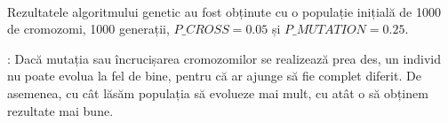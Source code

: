 \documentclass[paper=a4, fontsize=11pt]{scrartcl}
\begin{document}
\begin{table}[h]
    \end{table}


\begin{table}[h]
    \end{table}

\paragraph{}
Rezultatele algoritmului genetic au fost obținute cu o populație inițială de 1000 de cromozomi, 1000 generații,
$P\_CROSS = 0.05$ și $P\_MUTATION = 0.25$.

\underline{}: Dacă mutația sau încrucișarea cromozomilor se realizează prea des, un individ nu poate evolua la fel de bine,
pentru că ar ajunge să fie complet diferit.
De asemenea, cu cât lăsăm populația să evolueze mai mult, cu atât o să obținem rezultate mai bune.
\end{document}
